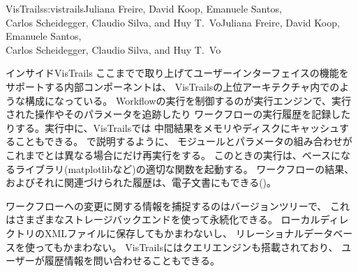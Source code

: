 \begin{aosachaptertoc}{VisTrails}{s:vistrails}{Juliana Freire, David Koop, Emanuele Santos, \\ Carlos Scheidegger, Claudio Silva, and Huy T.\ Vo}{Juliana Freire, David Koop, Emanuele Santos, \\ \hspace*{0.9cm} Carlos Scheidegger, Claudio Silva, and Huy T.\ Vo}
\begin{aosasect1}{インサイドVisTrails}
ここまでで取り上げてユーザーインターフェイスの機能をサポートする内部コンポーネントは、
VisTrailsの上位アーキテクチャ内でのような構成になっている。
Workflowの実行を制御するのが実行エンジンで、実行された操作やそのパラメータを追跡したり
ワークフローの実行履歴を記録したりする。実行中に、VisTrailsでは
中間結果をメモリやディスクにキャッシュすることもできる。
で説明するように、
モジュールとパラメータの組み合わせがこれまでとは異なる場合にだけ再実行をする。
このときの実行は、ベースになるライブラリ(matplotlibなど)の適切な関数を起動する。
ワークフローの結果、およびそれに関連づけられた履歴は、電子文書にもできる()。

ワークフローへの変更に関する情報を捕捉するのはバージョンツリーで、
これはさまざまなストレージバックエンドを使って永続化できる。
ローカルディレクトリのXMLファイルに保存してもかまわないし、
リレーショナルデータベースを使ってもかまわない。
VisTrailsにはクエリエンジンも搭載されており、
ユーザーが履歴情報を問い合わせることもできる。


\end{aosasect1}
\end{aosachaptertoc}
